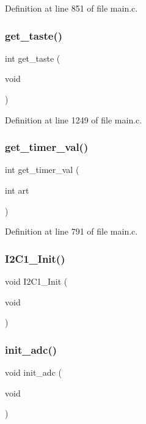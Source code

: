 Definition at line 851 of file main.\+c.

\mbox{\label{main_8c_abd525fce1f89febcc81248f627264698}} 
\subsubsection{get\+\_\+taste()}
{\footnotesize\ttfamily int get\+\_\+taste (\begin{DoxyParamCaption}\item[{void}]{ }\end{DoxyParamCaption})}



Definition at line 1249 of file main.\+c.

\mbox{\label{main_8c_a82cc6dfdd74fb12e4a4c04399fb0144e}} 
\subsubsection{get\+\_\+timer\+\_\+val()}
{\footnotesize\ttfamily int get\+\_\+timer\+\_\+val (\begin{DoxyParamCaption}\item[{int}]{art }\end{DoxyParamCaption})}



Definition at line 791 of file main.\+c.

\mbox{\label{main_8c_a430209a4fbf1bf97ef338b1c82ec83d4}} 
\subsubsection{I2\+C1\+\_\+\+Init()}
{\footnotesize\ttfamily void I2\+C1\+\_\+\+Init (\begin{DoxyParamCaption}\item[{void}]{ }\end{DoxyParamCaption})}

\mbox{\label{main_8c_ab15cf82f0329bc4d7262c03559eaaa8e}} 
\subsubsection{init\+\_\+adc()}
{\footnotesize\ttfamily void init\+\_\+adc (\begin{DoxyParamCaption}\item[{void}]{ }\end{DoxyParamCaption})}



